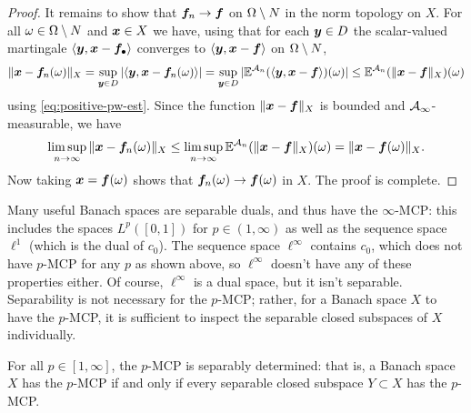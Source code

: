 \begin{proof}
  It remains to show that $\bm{f}_n \to \bm{f}$ on $\Omega \setminus N$ in the norm topology on $X$.
  For all $\omega \in \Omega \setminus N$ and $\bm{x} \in X$ we have, using that for each $\bm{y} \in D$ the scalar-valued martingale $\langle \bm{y}, \bm{x} - \bm{f}_\bullet \rangle$ converges to $\langle \bm{y}, \bm{x} - \bm{f}\rangle$ on $\Omega \setminus N$, 
  \begin{equation*}
    \|\bm{x} - \bm{f}_n(\omega)\|_{X}
    = \sup_{\bm{y} \in D} |\langle \bm{y}, \bm{x} - \bm{f}_n(\omega) \rangle| 
    = \sup_{\bm{y} \in D} |\mathbb{E}^{\mathcal{A}_n} (\langle \bm{y}, \bm{x} - \bm{f} \rangle)(\omega) | 
    \leq \mathbb{E}^{\mathcal{A}_n}( \|\bm{x} - \bm{f}\|_{X})(\omega)
  \end{equation*}
  using \eqref{eq:positive-pw-est}.
  Since the function $\|\bm{x} - \bm{f}\|_{X}$ is bounded and $\mathcal{A}_{\infty}$-measurable, we have
  \begin{equation*}
    \limsup_{n \to \infty} \|\bm{x} - \bm{f}_n(\omega)\|_{X} \leq \limsup_{n \to \infty} \mathbb{E}^{\mathcal{A}_n}( \|\bm{x} - \bm{f}\|_{X})(\omega) = \|\bm{x} - \bm{f}(\omega)\|_{X}.
  \end{equation*}
  Now taking $\bm{x} = \bm{f}(\omega)$ shows that $\bm{f}_n(\omega) \to \bm{f}(\omega)$ in $X$.
  The proof is complete.  
\end{proof}

Many useful Banach spaces are separable duals, and thus have the $\infty$-MCP: this includes the spaces $L^p([0,1])$ for $p \in (1,\infty)$ as well as the sequence space $\ell^1$ (which is the dual of $c_0$).
The sequence space $\ell^\infty$ contains $c_0$, which does not have $p$-MCP for any $p$ as shown above, so $\ell^\infty$ doesn't have any of these properties either.
Of course, $\ell^\infty$ is a dual space, but it isn't separable.
Separability is not necessary for the $p$-MCP; rather, for a Banach space $X$ to have the $p$-MCP, it is sufficient to inspect the separable closed subspaces of $X$ individually.

\begin{lem}\label{lem:MCP-sepdet}
  For all $p \in [1,\infty]$, the $p$-MCP is separably determined: that is, a Banach space $X$ has the $p$-MCP if and only if every separable closed subspace $Y \subset X$ has the $p$-MCP.
\end{lem}

